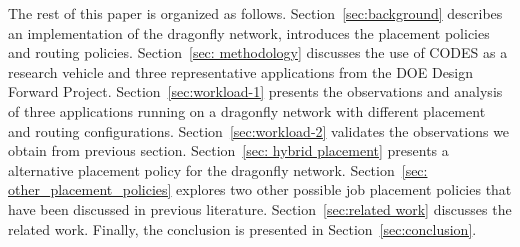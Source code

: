 The rest of this paper is organized as follows. Section~\ref{sec:background} describes an implementation of the dragonfly network, introduces the placement policies and routing policies. Section~\ref{sec: methodology} discusses the use of CODES as a research vehicle and three representative applications from the DOE Design Forward Project. Section~\ref{sec:workload-1} presents the observations and analysis of three applications running on a dragonfly network with different placement and routing configurations. Section~\ref{sec:workload-2} validates the observations we obtain from previous section. Section~\ref{sec: hybrid placement} presents a alternative placement policy for the dragonfly network. Section~\ref{sec: other_placement_policies} explores two other possible job placement policies that have been discussed in previous literature. 
Section~\ref{sec:related work} discusses the related work. Finally, the conclusion is presented in Section~\ref{sec:conclusion}.


